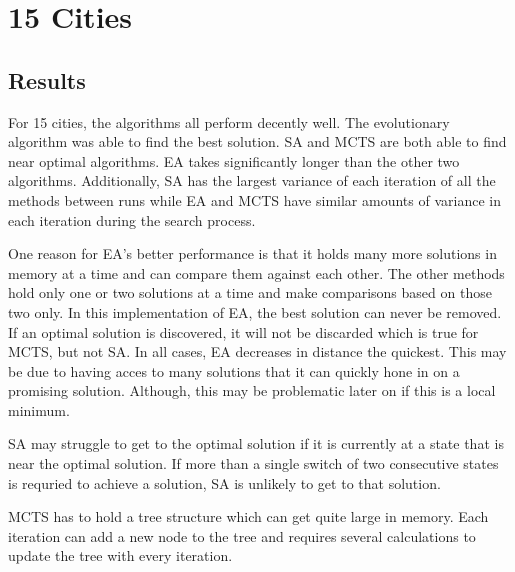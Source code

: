\section{15 Cities}
\subsection{Results}
For 15 cities, the algorithms all perform decently well.  The evolutionary algorithm was able to find the best solution.  SA and MCTS are both able to find near optimal algorithms.  EA takes significantly longer than the other two algorithms.  Additionally, SA has the largest variance of each iteration of all the methods between runs while EA and MCTS have similar amounts of variance in each iteration during the search process.    

One reason for EA's better performance is that it holds many more solutions in memory at a time and can compare them against each other.  The other methods hold only one or two solutions at a time and make comparisons based on those two only.  In this implementation of EA, the best solution can never be removed.  If an optimal solution is discovered, it will not be discarded which is true for MCTS, but not SA.  In all cases, EA decreases in distance the quickest.  This may be due to having acces to many solutions that it can quickly hone in on a promising solution.  Although, this may be problematic later on if this is a local minimum.

SA may struggle to get to the optimal solution if it is currently at a state that is near the optimal solution.  If more than a single switch of two consecutive states is requried to achieve a solution, SA is unlikely to get to that solution.

MCTS has to hold a tree structure which can get quite large in memory.  Each iteration can add a new node to the tree and requires several calculations to update the tree with every iteration.  

